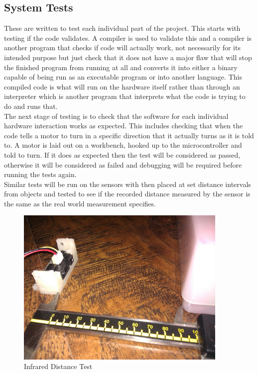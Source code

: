 \subsection{System Tests}
These are written to test each individual part of the project.  This starts with testing if the code validates.  A compiler is used to validate this and a compiler is another program that checks if code will actually work, not necessarily for its intended purpose but just check that it does not have a major flaw that will stop the finished program from running at all and converts it into either a binary capable of being run as an executable program or into another language.  This compiled code is what will run on the hardware itself rather than through an interpreter which is another program that interprets what the code is trying to do and runs that.
\\The next stage of testing is to check that the software for each individual hardware interaction works as expected.  This includes checking that when the code tells a motor to turn in a specific direction that it actually turns as it is told to.  A motor is laid out on a workbench, hooked up to the microcontroller and told to turn.  If it does as expected then the test will be considered as passed, otherwise it will be considered as failed and debugging will be required before running the tests again.
\\Similar tests will be run on the sensors with then placed at set distance intervals from objects and tested to see if the recorded distance measured by the sensor is the same as the real world measurement specifies.
\begin{figure}[h]
\centering
        \includegraphics[width=4.0in] {Images/ir-measure-2.jpg}
        \caption{Infrared Distance Test}
        \label{Infrared Distance Test}
\end{figure}
